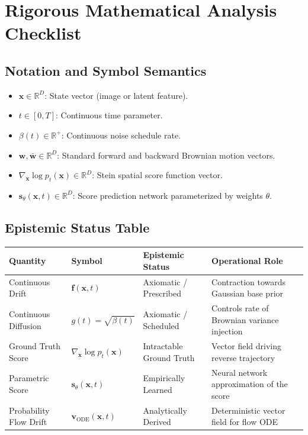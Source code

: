 \documentclass[11pt,a4paper]{article}
\theoremstyle{definition}
\begin{document}
\section{Rigorous Mathematical Analysis Checklist}

\subsection{Notation and Symbol Semantics}
\begin{itemize}
    \item $\mathbf{x} \in \mathbb{R}^D$: State vector (image or latent feature).
    \item $t \in [0, T]$: Continuous time parameter.
    \item $\beta(t) \in \mathbb{R}^+$: Continuous noise schedule rate.
    \item $\mathbf{w}, \bar{\mathbf{w}} \in \mathbb{R}^D$: Standard forward and backward Brownian motion vectors.
    \item $\nabla_\mathbf{x} \log p_t(\mathbf{x}) \in \mathbb{R}^D$: Stein spatial score function vector.
    \item $\mathbf{s}_\theta(\mathbf{x}, t) \in \mathbb{R}^D$: Score prediction network parameterized by weights $\theta$.
\end{itemize}

\subsection{Epistemic Status Table}
\begin{table}[h]
\centering
\small
\begin{tabular}{@{}llll@{}}
\toprule
\textbf{Quantity} & \textbf{Symbol} & \textbf{Epistemic Status} & \textbf{Operational Role} \\
\midrule
Continuous Drift & $\mathbf{f}(\mathbf{x}, t)$ & Axiomatic / Prescribed & Contraction towards Gaussian base prior \\
Continuous Diffusion & $g(t) = \sqrt{\beta(t)}$ & Axiomatic / Scheduled & Controls rate of Brownian variance injection \\
Ground Truth Score & $\nabla_\mathbf{x} \log p_t(\mathbf{x})$ & Intractable Ground Truth & Vector field driving reverse trajectory \\
Parametric Score & $\mathbf{s}_\theta(\mathbf{x}, t)$ & Empirically Learned & Neural network approximation of the score \\
Probability Flow Drift & $\mathbf{v}_{\text{ODE}}(\mathbf{x}, t)$ & Analytically Derived & Deterministic vector field for flow ODE \\
\bottomrule
\end{tabular}
\end{table}
\end{document}
